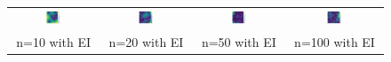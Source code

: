\documentclass[11pt]{article}
\begin{document}
\begin{figure}[H]
    \centering
    \begin{tabular}{cccc}
        \includegraphics[width=0.225\textwidth]{../Task-02/plots/gp_std_matern_n10_EI.png} &
        \includegraphics[width=0.225\textwidth]{../Task-02/plots/gp_std_matern_n20_EI.png} &
        \includegraphics[width=0.225\textwidth]{../Task-02/plots/gp_std_matern_n50_EI.png} &
        \includegraphics[width=0.225\textwidth]{../Task-02/plots/gp_std_matern_n100_EI.png} \\
        n=10 with EI & n=20 with EI & n=50 with EI & n=100 with EI \\[0.5em]
        

\end{tabular}
\end{figure}
\end{document}

